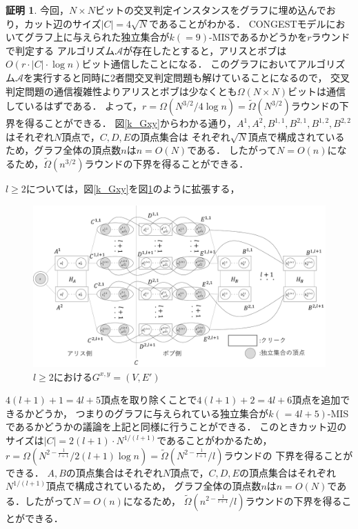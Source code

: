 \documentclass[12pt]{thesis}
\newcommand{\CONGEST}{\textsf{CONGEST}}
\theoremstyle{definition}
\newtheorem*{prf*}{証明}
\begin{document}
\begin{prf*}
今回，$N \times N$ビットの交叉判定インスタンスをグラフに埋め込んでおり，カット辺のサイズ$|C| = 4 \sqrt{N}$であることがわかる．
{\CONGEST}モデルにおいてグラフ上に与えられた独立集合が$k( = 9)$-MISであるかどうかを$r$ラウンドで判定する
アルゴリズム$\mathcal{A}$が存在したとすると，アリスとボブは$O(r \cdot |C| \cdot \log n)$ビット通信したことになる．
このグラフにおいてアルゴリズム$\mathcal{A}$を実行すると同時に2者間交叉判定問題も解けていることになるので，
交叉判定問題の通信複雑性よりアリスとボブは少なくとも$\Omega (N \times N)$ビットは通信しているはずである．
よって，$r = \Omega \left(N^{3/2} / 4\log n\right) = \tilde{\Omega}\left(N^{3/2}\right)$ラウンドの下界を得ることができる．
図\ref{k_Gxy}からわかる通り，$A^{1}, A^{2}, B^{1,1}, B^{2,1}, B^{1,2}, B^{2,2}$はそれぞれ$N$頂点で，$C, D, E$の頂点集合は
それぞれ$\sqrt{N}$頂点で構成されているため，グラフ全体の頂点数$n$は$n = O(N)$である．
したがって$N = O(n)$になるため，$\tilde{\Omega}\left(n^{3/2}\right)$ラウンドの下界を得ることができる． 

$l \geq 2$については，図\ref{k_Gxy}を図\ref{k_Gxyl}のように拡張する，

\begin{figure}[ht]
\begin{center}
\includegraphics[width=120mm]{k_Gxyl.png}
\end{center}
\caption{$l \geq 2$における$G^{x, y} = (V, E')$}
\label{k_Gxyl}
\end{figure}

$4(l + 1) + 1 = 4l + 5$頂点を取り除くことで$4(l + 1) + 2 = 4l + 6$頂点を追加できるかどうか，
つまりのグラフに与えられている独立集合が$k( = 4l + 5)$-MISであるかどうかの議論を上記と同様に行うことができる．
このときカット辺のサイズは$|C| = 2(l + 1) \cdot N^{1/(l + 1)}$であることがわかるため，
$r = \Omega \left(N^{2 - \frac{1}{l + 1}} / 2( l + 1)\log n\right) = \tilde{\Omega}\left(N^{2 - \frac{1}{l + 1}}/l\right)$ラウンドの
下界を得ることができる．
$A, B$の頂点集合はそれぞれ$N$頂点で，$C, D, E$の頂点集合はそれぞれ$N^{1/(l + 1)}$頂点で構成されているため，
グラフ全体の頂点数$n$は$n = O(N)$である．したがって$N = O(n)$になるため，
$\tilde{\Omega}\left(n^{2 - \frac{1}{l + 1}}/l\right)$ラウンドの下界を得ることができる．
\end{prf*}
\newpage
\end{document}
